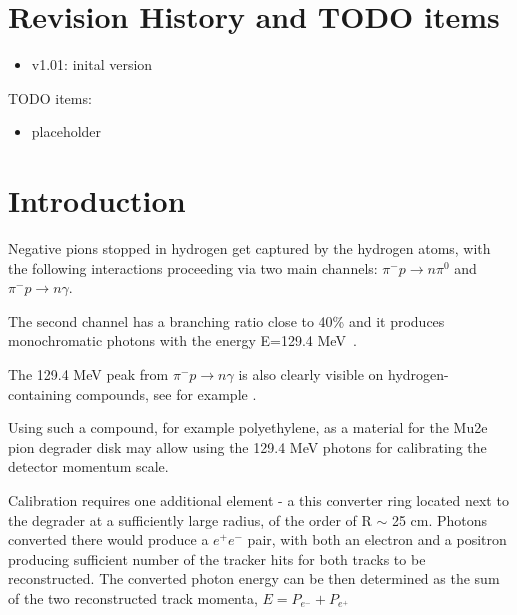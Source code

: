 \documentclass[12pt]{article}
\begin{document}
% 


\newpage
\section {Revision History and TODO items}

\begin{itemize}
\item
  v1.01: inital version
\end{itemize}

TODO items:

\begin{itemize}
\item
  placeholder
\end{itemize}

\newpage
\section {Introduction}
Negative pions stopped in hydrogen get captured by the hydrogen atoms, 
with the following interactions proceeding via two main channels:
$\pi^- p \to n\pi^0$ and $\pi^- p \to n \gamma$.

The second channel has a branching ratio close to 40\% and it produces monochromatic
photons with the energy E=129.4 MeV~\cite{something_on_RPC}.

The 129.4 MeV peak from $\pi^- p \to n \gamma$ is also clearly visible on hydrogen-containing
compounds, see for example \cite{}.

Using such a compound, for example polyethylene, as a material for the Mu2e pion degrader
disk may allow using the 129.4 MeV photons for calibrating the detector momentum scale.

Calibration requires one additional element - a this converter ring located next to the degrader
at a sufficiently large radius, of the order of R $\sim$ 25 cm. Photons converted there would
produce a $e^+e^-$ pair, with both an electron and a positron producing sufficient number of
the tracker hits for both tracks to be reconstructed. 
The converted photon energy can be then determined as the sum of the two reconstructed
track momenta, $E = P_{e^-} + P_{e^+}$ 
\end{document}

